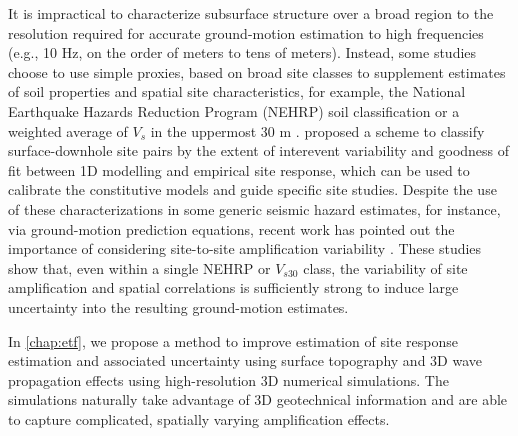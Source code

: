 It is impractical to characterize subsurface structure over a broad region to the resolution required for accurate ground-motion estimation to high frequencies (e.g., 10 Hz, on the order of meters to tens of meters). Instead, some studies choose to use simple proxies, based on broad site classes to supplement estimates of soil properties and spatial site characteristics, for example, the National Earthquake Hazards Reduction Program (NEHRP) soil classification \citep{bssc2003NEHRPRecommended2003,akkarEmpiricalEquationsPrediction2010} or a weighted average of $V_s$ in the uppermost 30 m \citep[$V_{S30}$, e.g., ][]{abrahamsonSummaryAbrahamsonSilva2008,idrissNGAWest2EmpiricalModel2014}. \citet{thompsonTaxonomySiteResponse2012} proposed a scheme to classify surface-downhole site pairs by the extent of interevent variability and goodness of fit between 1D modelling and empirical site response, which can be used to calibrate the constitutive models and guide specific site studies. Despite the use of these characterizations in some generic seismic hazard estimates, for instance, via ground-motion prediction equations, recent work has pointed out the importance of considering site-to-site amplification variability \citep{atkinsonEarthquakeGroundmotionPrediction2006,atikVariabilityGroundmotionPrediction2010}. These studies show that, even within a single NEHRP or $V_{s30}$ class, the variability of site amplification and spatial correlations is sufficiently strong to induce large uncertainty into the resulting ground-motion estimates.

In \cref{chap:etf}, we propose a method to improve estimation of site response estimation and associated uncertainty using surface topography and 3D wave propagation effects using high-resolution 3D numerical simulations. The simulations naturally take advantage of 3D geotechnical information and are able to capture complicated, spatially varying amplification effects.


\renewcommand{\thetable}{\arabic{table}}
\renewcommand{\thefigure}{\arabic{figure}}

